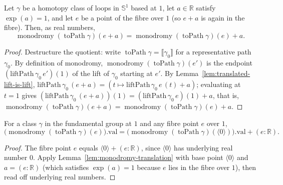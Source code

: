 \begin{lemma}
    \label{lem:monodromy-translation}
    \leanok
    Let \(\gamma\) be a homotopy class of loops in \(\mathbb{S}^1\) based at \(1\), let
    \(a \in \mathbb{R}\) satisfy \(\exp(a) = 1\), and let \(e\) be a point of the fibre over
    \(1\) (so \(e + a\) is again in the fibre). Then, as real numbers,
    \[
      \operatorname{monodromy}(\operatorname{toPath}\gamma)(e + a)
        = \operatorname{monodromy}(\operatorname{toPath}\gamma)(e) + a .
    \]
\end{lemma}
\begin{proof}
    Destructure the quotient: write \(\operatorname{toPath}\gamma = \llbracket\gamma_0\rrbracket\) for a
    representative path \(\gamma_0\). By definition of monodromy,
    \(\operatorname{monodromy}(\operatorname{toPath}\gamma)(e')\) is the endpoint
    \((\mathrm{liftPath}\,\gamma_0\,e')(1)\) of the lift of \(\gamma_0\) starting at \(e'\). By
    Lemma~\ref{lem:translated-lift-is-lift}, \(\mathrm{liftPath}\,\gamma_0\,(e + a) =
    (t \mapsto \mathrm{liftPath}\,\gamma_0\,e\,(t) + a)\); evaluating at \(t = 1\) gives
    \((\mathrm{liftPath}\,\gamma_0\,(e + a))(1) = (\mathrm{liftPath}\,\gamma_0\,e)(1) + a\), that is,
    \(\operatorname{monodromy}(\operatorname{toPath}\gamma)(e + a) =
    \operatorname{monodromy}(\operatorname{toPath}\gamma)(e) + a\).
\end{proof}

\begin{lemma}
    \label{lem:monodromy-val-of-fibre}
    \leanok
    For a class \(\gamma\) in the fundamental group at \(1\) and any fibre point \(e\) over \(1\),
    \[
      \bigl(\operatorname{monodromy}(\operatorname{toPath}\gamma)(e)\bigr).\mathrm{val}
        = \bigl(\operatorname{monodromy}(\operatorname{toPath}\gamma)(\langle 0\rangle)\bigr).\mathrm{val}
          + (e : \mathbb{R}).
    \]
\end{lemma}
\begin{proof}
    The fibre point \(e\) equals \(\langle 0\rangle + (e : \mathbb{R})\), since \(\langle 0\rangle\) has
    underlying real number \(0\). Apply Lemma~\ref{lem:monodromy-translation} with base point
    \(\langle 0\rangle\) and \(a = (e : \mathbb{R})\) (which satisfies \(\exp(a) = 1\) because \(e\) lies
    in the fibre over \(1\)), then read off underlying real numbers.
\end{proof}

